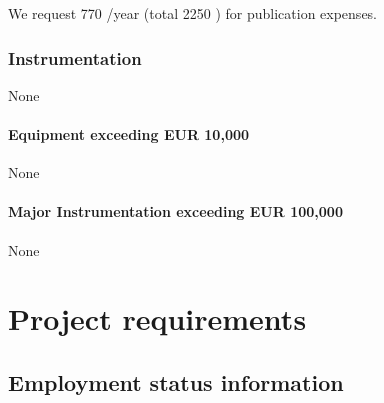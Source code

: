 \documentclass[10pt,fleqn,twoside]{article}
\begin{document}
We request 770 \EUR{}/year (total 2250 \EUR{}) for publication expenses.

\subsubsection{Instrumentation}

None 

\paragraph{Equipment exceeding EUR 10,000} 

None

\paragraph{Major Instrumentation exceeding EUR 100,000} 

None 

% 
% 
% 
% 
% 
% 
% 

\section{Project requirements}
\renewcommand{\leftmark}{\sc Project requirements}

\subsection{Employment status information}
\end{document}
